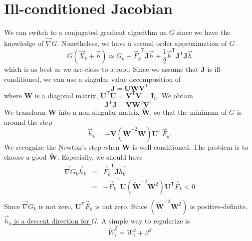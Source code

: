\documentclass[aps,twocolumn]{revtex4}
\newcommand{\mymat}[1]{\boldsymbol{#1}}
\newcommand{\mytrn}[1]{{#1}^{\mathsf{T}}}
\newcommand{\mygrad}{\vec{\nabla}}
\begin{document}
\section{Ill-conditioned Jacobian}
We can switch to a conjugated gradient algorithm on $G$ since we have the knowledge of $\mygrad G$.
Nonetheless, we have a second order approximation of $G$
\begin{equation}
	G\left(\vec{X}_k+\vec{h}\right) \simeq G_k + \mytrn{\vec{F}_k} \mymat{J} \vec{h} +
	\frac{1}{2} \mytrn{\vec{h}} \mytrn{\mymat{J}}\mymat{J} \vec{h}
\end{equation}
which is as best as we are close to a root.
Since we assume that $\mymat{J}$ is ill-conditioned, we can use a singular value decomposition
of
\begin{equation}
	\mymat{J} = \mymat{U} \mymat{W} \mytrn{\mymat{V}}
\end{equation}
where $\mymat{W}$ is a diagonal matrix, $\mytrn{\mymat{U}}\mymat{U}=\mytrn{\mymat{V}}\mymat{V}=\mymat{I}_n$.
We obtain
\begin{equation}
	\mytrn{\mymat{J}}\mymat{J} = \mymat{V} \mymat{W}^2 \mytrn{\mymat{V}}.
\end{equation}
We transform $\mymat{W}$ into a non-singular matrix $\widetilde{\mymat{W}}$,
so that the minimum of $G$ is around the step
\begin{equation}
	\vec{h}_k = - \mymat{V} \left( \widetilde{\mymat{W}}^{-2} \mymat{W}\right) \mytrn{\mymat{U}} \vec{F}_k.
\end{equation}
We recognize the Newton's step when $\mymat{W}$ is well-conditioned.
The problem is to choose a good $\widetilde{\mymat{W}}$.
Especially, we should have
\begin{equation}
\begin{array}{rcl}
	\mygrad G_k \vec{h}_k & = &\mytrn{\vec{F}_k} \mymat{J} \vec{h_k} \\
	& = & - \mytrn{\vec{F}_k} \mymat{U} \left( \widetilde{\mymat{W}}^{-2} \mymat{W}^2 \right)\mytrn{\mymat{U}} \vec{F}_k < 0\\
\end{array}
\end{equation}
Since $\mygrad G_k$ is not zero, $\mytrn{\mymat{U}} \vec{F}_k$ is not zero.
Since $\left( \widetilde{\mymat{W}}^{-2} \mymat{W}^2 \right)$ is positive-definite,
\underline{$\vec{h}_k$ is a descent direction for $G$}.
A simple way to regularize is
\begin{equation}
	\widetilde{W}_i^2 = W_i^2 + \beta^2 
\end{equation}
\end{document}
